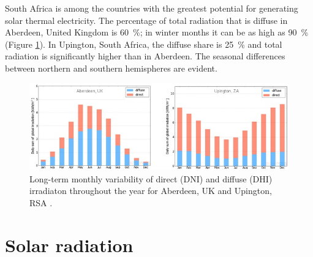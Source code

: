 South Africa is among the countries with the greatest potential for generating solar thermal electricity. The percentage of total radiation that is diffuse in Aberdeen, United Kingdom is \SI{60}{\percent}; in winter months it can be as high as \SI{90}{\percent} (Figure \ref{DHI-DIF}). In Upington, South Africa, the diffuse share is \SI{25}{\percent} and total radiation is significantly higher than in Aberdeen. The seasonal differences between northern and southern hemispheres are evident.

\begin{figure}[h!] %
\centering
\includegraphics[width=1\linewidth]{FIG/DHI-DIF}
\caption[Long-term monthly variability of direct (DNI) and diffuse (DHI) irradiaton throughout the year for Aberdeen, UK and Upington, RSA.]{Long-term monthly variability of direct (DNI) and diffuse (DHI) irradiaton throughout the year for Aberdeen, UK and Upington, RSA \cite{SolarGIS2015}.}\label{DHI-DIF}
\end{figure} 
\section{Solar radiation}

